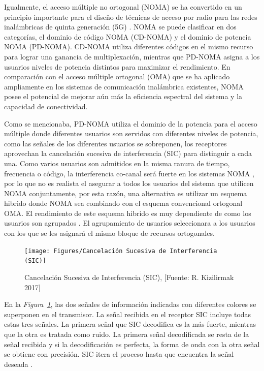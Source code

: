 Igualmente, el acceso múltiple no ortogonal (NOMA) se ha convertido en un principio importante para el diseño de técnicas de acceso por radio para las redes inalámbricas de quinta generación (5G) \parencite{DIng2017}. NOMA se puede clasificar en dos categorías, el dominio de código NOMA (CD-NOMA) y el dominio de potencia NOMA (PD-NOMA). CD-NOMA utiliza diferentes códigos en el mismo recurso para lograr una ganancia de multiplexación, mientras que PD-NOMA asigna a los usuarios niveles de potencia distintos para maximizar el rendimiento. En comparación con el acceso múltiple ortogonal (OMA) que se ha aplicado ampliamente en los sistemas de comunicación inalámbrica existentes, NOMA posee el potencial de mejorar aún más la eficiencia espectral del sistema y la capacidad de conectividad.\newline

Como se mencionaba, PD-NOMA utiliza el dominio de la potencia para el acceso múltiple donde diferentes usuarios son servidos con diferentes niveles de potencia, como las señales de los diferentes usuarios se sobreponen, los receptores aprovechan la cancelación sucesiva de interferencia (SIC) para distinguir a cada una. Como varios usuarios son admitidos en la misma ranura de tiempo, frecuencia o código, la interferencia co-canal será fuerte en los sistemas NOMA \parencite{Ding2016}, por lo que no es realista el asegurar a todos los usuarios del sistema que utilicen NOMA conjuntamente, por esta razón, una alternativa es utilizar un esquema hibrido donde NOMA sea combinado con el esquema convencional ortogonal OMA. El rendimiento de este esquema hibrido es muy dependiente de como los usuarios son agrupados \parencite{Ding2016}. El agrupamiento de usuarios seleccionara a los usuarios con los que se les asignará el mismo bloque de recursos ortogonales.\newline

\begin{figure}[th]
\centering
\texttt{[image: Figures/Cancelación Sucesiva de Interferencia (SIC)]}
\decoRule
\caption[Cancelación Sucesiva de Interferencia (SIC)]{Cancelación Sucesiva de Interferencia (SIC), [Fuente: R. Kizilirmak 2017]}
\label{fig:SIC}
\end{figure}

En la \textit{Figura~\ref{fig:SIC}}, las dos señales de información indicadas con diferentes colores se superponen en el transmisor. La señal recibida en el receptor SIC incluye todas estas tres señales. La primera señal que SIC decodifica es la más fuerte, mientras que la otra es tratada como ruido. La primera señal decodificada se resta de la señal recibida y si la decodificación es perfecta, la forma de onda con la otra señal se obtiene con precisión. SIC itera el proceso hasta que encuentra la señal deseada \parencite{Kizilirmak2016}.\newline

